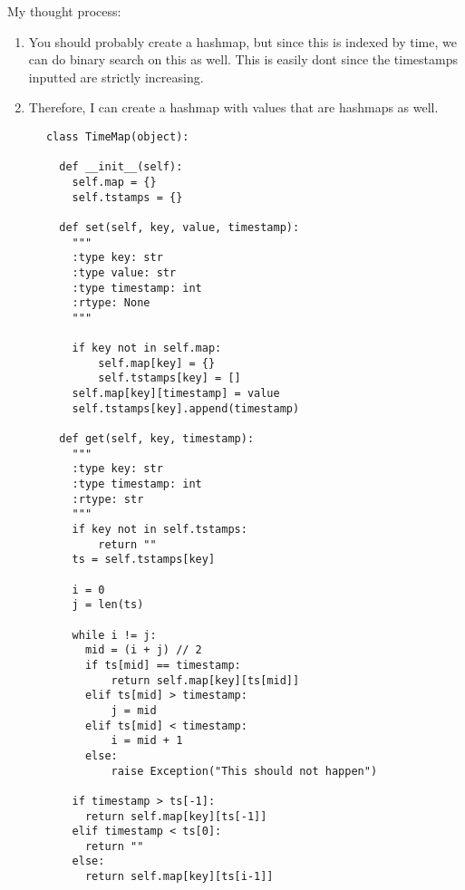 \documentclass{article}
\begin{document}
  \begin{example}
    My thought process: 
    \begin{enumerate}
      \item You should probably create a hashmap, but since this is indexed by time, we can do binary search on this as well. This is easily dont since the timestamps inputted are strictly increasing. 
      \item Therefore, I can create a hashmap with values that are hashmaps as well. 
    \end{enumerate}
    \begin{lstlisting}
      class TimeMap(object):

        def __init__(self):
          self.map = {}
          self.tstamps = {}

        def set(self, key, value, timestamp):
          """
          :type key: str
          :type value: str
          :type timestamp: int
          :rtype: None
          """

          if key not in self.map: 
              self.map[key] = {} 
              self.tstamps[key] = []
          self.map[key][timestamp] = value 
          self.tstamps[key].append(timestamp)

        def get(self, key, timestamp):
          """
          :type key: str
          :type timestamp: int
          :rtype: str
          """
          if key not in self.tstamps: 
              return "" 
          ts = self.tstamps[key]

          i = 0 
          j = len(ts) 

          while i != j: 
            mid = (i + j) // 2 
            if ts[mid] == timestamp: 
                return self.map[key][ts[mid]]
            elif ts[mid] > timestamp: 
                j = mid 
            elif ts[mid] < timestamp: 
                i = mid + 1 
            else: 
                raise Exception("This should not happen") 

          if timestamp > ts[-1]: 
            return self.map[key][ts[-1]]
          elif timestamp < ts[0]: 
            return "" 
          else: 
            return self.map[key][ts[i-1]]
    \end{lstlisting}
  \end{example}
\end{document}
